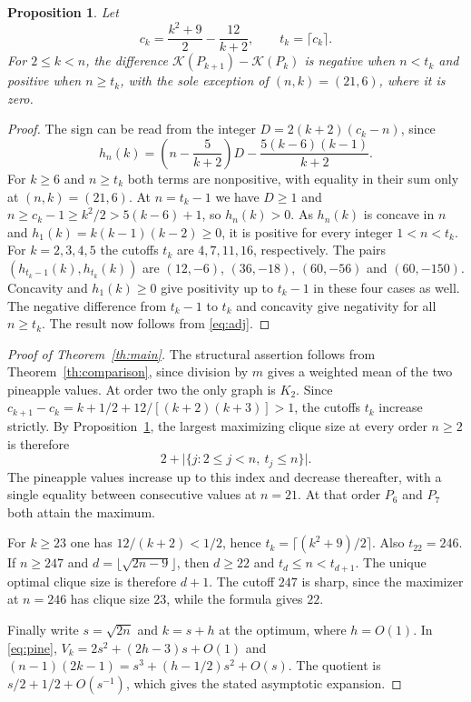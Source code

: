 \documentclass[11pt]{amsart}
\newtheorem{proposition}[theorem]{Proposition}
\numberwithin{equation}{section}
\newcommand{\K}{\mathcal K}
\begin{document}
\begin{proposition}\label{prop:cutoff}
Let
\[
 c_k=\frac{k^2+9}{2}-\frac{12}{k+2},\qquad t_k=\lceil c_k\rceil .
\]
For $2\le k<n$, the difference $\K(P_{k+1})-\K(P_k)$ is negative
when $n<t_k$ and positive when $n\ge t_k$, with the sole exception
of $(n,k)=(21,6)$, where it is zero.
\end{proposition}
\begin{proof}
The sign can be read from the integer $D=2(k+2)(c_k-n)$, since
\[
 h_n(k)=\left(n-\frac5{k+2}\right)D-\frac{5(k-6)(k-1)}{k+2}.
\]
For $k\ge6$ and $n\ge t_k$ both terms are nonpositive, with
equality in their sum only at $(n,k)=(21,6)$. At $n=t_k-1$ we have
$D\ge1$ and $n\ge c_k-1\ge k^2/2>5(k-6)+1$, so $h_n(k)>0$.
As $h_n(k)$ is concave in $n$ and $h_1(k)=k(k-1)(k-2)\ge0$,
it is positive for every integer $1<n<t_k$.
For $k=2,3,4,5$ the cutoffs
$t_k$ are $4,7,11,16$, respectively. The pairs
$(h_{t_k-1}(k),h_{t_k}(k))$ are $(12,-6)$, $(36,-18)$,
$(60,-56)$ and $(60,-150)$. Concavity and $h_1(k)\ge0$ give
positivity up to $t_k-1$ in these four cases as well. The negative
difference from $t_k-1$ to $t_k$ and concavity give negativity for
all $n\ge t_k$. The result now follows from \eqref{eq:adj}.
\end{proof}

\begin{proof}[Proof of Theorem~\ref{th:main}]
The structural assertion follows from Theorem~\ref{th:comparison},
since division by $m$ gives a weighted mean of the two pineapple
values. At order two the only graph is $K_2$.
Since $c_{k+1}-c_k=k+1/2+12/[(k+2)(k+3)]>1$, the cutoffs $t_k$
increase strictly. By Proposition~\ref{prop:cutoff}, the largest
maximizing clique size at every order $n\ge2$ is therefore
\begin{equation}\label{eq:all-orders}
 2+\bigl|\{j:2\le j<n,\ t_j\le n\}\bigr|.
\end{equation}
The pineapple values increase up to this index and decrease thereafter,
with a single equality between consecutive values at $n=21$. At that
order $P_6$ and $P_7$ both attain the maximum.

For $k\ge23$ one has $12/(k+2)<1/2$, hence
$t_k=\lceil(k^2+9)/2\rceil$. Also $t_{22}=246$.
If $n\ge247$ and $d=\lfloor\sqrt{2n-9}\rfloor$, then $d\ge22$
and $t_d\le n<t_{d+1}$. The unique optimal clique size is therefore
$d+1$. The cutoff $247$ is sharp, since the maximizer at $n=246$ has
clique size $23$, while the formula gives $22$.

Finally write $s=\sqrt{2n}$ and $k=s+h$ at the optimum, where $h=O(1)$.
In \eqref{eq:pine}, $V_k=2s^2+(2h-3)s+O(1)$ and
$(n-1)(2k-1)=s^3+(h-1/2)s^2+O(s)$.
The quotient is $s/2+1/2+O(s^{-1})$, which gives the stated
asymptotic expansion.
\end{proof}
\end{document}
